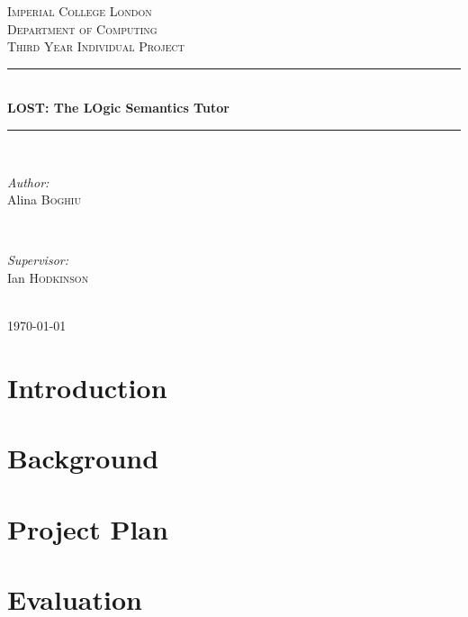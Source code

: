 \documentclass{article}
\begin{document}

\begin{titlepage}
\newcommand{\HRule}{\rule{\linewidth}{0.5mm}}
\center
\textsc{\LARGE Imperial College London}  \\[1.5cm]
\textsc{\Large Department of Computing}  \\[0.5cm]
\textsc{\large Third Year Individual Project} \\[0.5cm]

\HRule \\[0.6cm]
{\huge \bfseries LOST: The LOgic Semantics Tutor} \\[0.3cm]
\HRule \\[1.5cm]

\begin{minipage}{0.4\textwidth}

\begin{flushleft} \large \emph{Author:} \\
Alina  \textsc{Boghiu}
\end{flushleft}

\end{minipage}~
\begin{minipage}{0.4\textwidth}
\begin{flushright} \large \emph{Supervisor:} \\
Ian \textsc{Hodkinson}
\end{flushright}

\end{minipage}\\[4cm]

{\large \today}\\[3cm]
\vfill
\end{titlepage}


\section{Introduction}		%

\section{Background}		%

\section{Project Plan}		%

\section{Evaluation}		%
\end{document}
